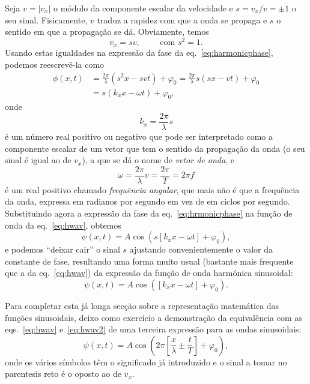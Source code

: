 Seja $v=|v_x|$ o módulo da componente escalar da velocidade e $s=v_x/v=\pm1$ o
seu sinal. Fisicamente, $v$ traduz a rapidez com que a onda se propaga e $s$ o
sentido em que a propagação se dá. Obviamente, temos
\begin{equation*}
v_x=sv,\qquad\text{ com }s^2=1.
\end{equation*}
Usando estas igualdades na expressão da fase da eq.~\eqref{eq:harmonicphase},
podemos reescrevê-la como
\begin{align}
    \phi(x,t)&=\frac{2\pi}{\lambda}(s^2x-svt)+\varphi_0=
    \frac{2\pi}{\lambda}s(sx-vt)+\varphi_0\nonumber\\
&=s(k_xx-\omega t)+\varphi_0,\label{eq:hrmonicphase}
\end{align}
onde
\begin{equation}
k_x=\frac{2\pi}{\lambda}s
\end{equation}
é um número real positivo ou negativo que pode ser interpretado como a
componente escalar de um vetor que tem o sentido da propagação da onda (o seu
sinal é igual ao de $v_x$), a que se dá o nome de \emph{vetor de onda}, e
\begin{equation}
\omega=\frac{2\pi}{\lambda}v=\frac{2\pi}{T}=2\pi f
\end{equation}
é um real positivo chamado \emph{frequência angular}, que mais não é que a
frequência da onda, expressa em radianos por segundo em vez de em ciclos por
segundo. Substituindo agora a expressão da fase da eq.~\eqref{eq:hrmonicphase}
na função de onda da eq.~\eqref{eq:hwav}, obtemos
\begin{equation*}
\psi(x,t)=A\cos(s[k_xx-\omega t] +\varphi_0),
\end{equation*}
e podemos ``deixar cair'' o sinal $s$ ajustando convenientemente
o valor da constante de fase, resultando uma forma muito usual
(bastante mais frequente que a da eq.~\eqref{eq:hwav}) da expressão da função de
onda harmónica sinusoidal:
\begin{equation}\label{eq:hwav2}
\psi(x,t)=A\cos([k_xx-\omega t] +\varphi_0).
\end{equation}

Para completar esta já longa secção sobre a representação matemática das funções
sinusoidais, deixo como exercício a demonstração da equivalência com as
eqs.~\eqref{eq:hwav} e~\eqref{eq:hwav2} de uma terceira expressão para as ondas
sinusoidais:
\begin{equation*}
\psi(x,t) = A\cos\left(2\pi\left[\frac{x}{\lambda}\pm\frac{t}{T}\right]+\varphi_0
\right),
\end{equation*}
onde os vários símbolos têm o significado já introduzido e o sinal a tomar no
parentesis reto é o oposto ao de $v_x$.



